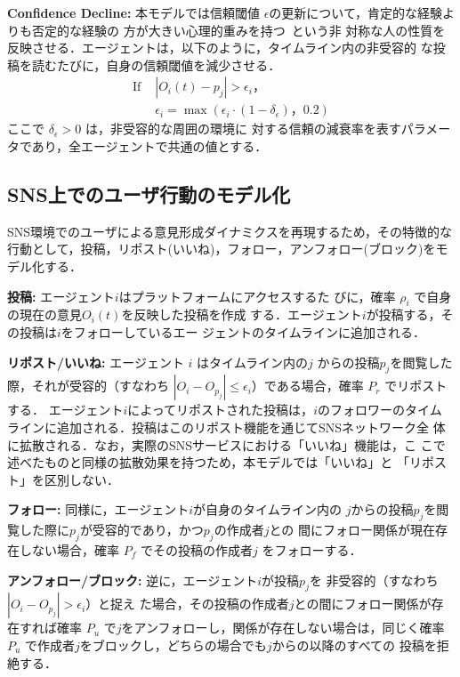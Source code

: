 \documentclass[a4j]{ujarticle}
\def\post{\rho} %
\def\BoundedConfidence{\epsilon}
\begin{document}
\begin{description}
\item \textbf{Confidence Decline:}\label{ConfDec} 本モデルでは信頼閾値
  $\BoundedConfidence$の更新について，肯定的な経験よりも否定的な経験の
  方が大きい心理的重みを持つ~\cite{Vallone1985,Baumeister2001}という非
  対称な人の性質を反映させる．エージェントは，以下のように，タイムライン内の非受容的
  な投稿を読むたびに，自身の信頼閾値を減少させる．
  \begin{equation}
    \begin{aligned}
    \text{If } & |O_i(t) - p_j| > \BoundedConfidence_i，\\[-2pt] 
    & \BoundedConfidence_i = \max(\BoundedConfidence_i \cdot (1 - \delta_{\BoundedConfidence})，0.2)
    \end{aligned}
  \end{equation}
  ここで $\delta_{\BoundedConfidence} > 0$ は，非受容的な周囲の環境に
  対する信頼の減衰率を表すパラメータであり，全エージェントで共通の値とする．
\end{description}


\subsection{SNS上でのユーザ行動のモデル化}
SNS環境でのユーザによる意見形成ダイナミクスを再現するため，その特徴的な行動として，投稿，リポスト(いいね)，フォロー，アンフォロー(ブロック)をモデル化する．


\begin{description}
\item \textbf{投稿:} エージェント$i$はプラットフォームにアクセスするた
  びに，確率 $\post_i$ で自身の現在の意見$O_i(t)$を反映した投稿を作成
  する．エージェント$i$が投稿する，その投稿は$i$をフォローしているエー
  ジェントのタイムラインに追加される．
\item \textbf{リポスト/いいね:} エージェント $i$ はタイムライン内の$j$
  からの投稿$p_j$を閲覧した際，それが受容的（すなわち $|O_i - O_{p_j}|
    \leq \BoundedConfidence_i$）である場合，確率 $P_r$ でリポストする．
  エージェント$i$によってリポストされた投稿は，$i$のフォロワーのタイム
  ラインに追加される．投稿はこのリポスト機能を通じてSNSネットワーク全
  体に拡散される．なお，実際のSNSサービスにおける「いいね」機能は，こ
  こで述べたものと同様の拡散効果を持つため，本モデルでは「いいね」と
  「リポスト」を区別しない．

\item \textbf{フォロー:} 同様に，エージェント$i$が自身のタイムライン内の
  $j$からの投稿$p_j$を閲覧した際に$p_j$が受容的であり，かつ$p_j$の作成者$j$との
  間にフォロー関係が現在存在しない場合，確率 $P_f$ でその投稿の作成者$j$
  をフォローする．
  
\item \textbf{アンフォロー/ブロック:} 逆に，エージェント$i$が投稿$p_j$を
  非受容的（すなわち $|O_i - O_{p_j}| > \BoundedConfidence_i$）と捉え
  た場合，その投稿の作成者$j$との間にフォロー関係が存在すれば確率 $P_u$
  で$j$をアンフォローし，関係が存在しない場合は，同じく確率 $P_u$
  で作成者$j$をブロックし，どちらの場合でも$j$からの以降のすべての
  投稿を拒絶する．
\end{description}
\end{document}
